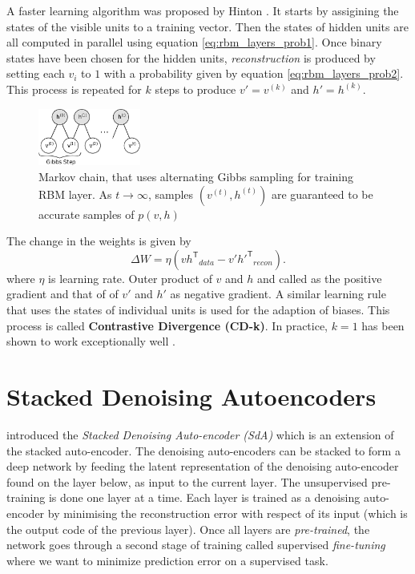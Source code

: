A faster learning algorithm was proposed by Hinton \cite{hinton2002training,hinton2006reducing,hinton2010practical}. It starts by assigining the states of the visible units to a training vector. Then the states of hidden units are all computed in parallel using equation \ref{eq:rbm_layers_prob1}. Once binary states have been chosen for the hidden units, \textit{reconstruction} is produced by setting each $v_i$ to $1$ with a probability given by equation \ref{eq:rbm_layers_prob2}. This process is repeated for $k$ steps to produce $v'= v^{(k)}$ and $h' = h^{(k)}$. 

\begin{figure}[ht]
\centering
\includegraphics[width=0.3\textwidth]{./imgs/markov_chain.png}
\caption[Markov chain of training RBM layer]{Markov chain, that uses alternating Gibbs sampling for training RBM layer. As $t \rightarrow \infty$, samples $(v^{(t)}, h^{(t)})$ are guaranteed to be accurate samples of $p(v,h)$}
\label{fig:rbmmarkovChain}
\end{figure}

The change in the weights is given by
$$ \Delta W = \eta ({vh^\mathsf{T}}_{data} - {v'h'^{\mathsf{T}}}_{recon}). $$
where $\eta$ is learning rate. Outer product of $v$ and $h$ and called as the positive gradient and that of of $v'$ and $h'$ as negative gradient. A similar learning rule that uses the states of individual units is used for the adaption of biases. This process is called \textbf{Contrastive Divergence (CD-k)}. In practice, $k=1$ has been shown to work exceptionally well \cite{hinton2010practical}.

\section{Stacked Denoising Autoencoders}
\citet{vincent2010stacked} introduced the \emph{Stacked Denoising Auto-encoder (SdA)} which is an extension of the stacked auto-encoder. The denoising auto-encoders can be stacked to form a deep network by feeding the latent representation of the denoising auto-encoder found on the layer below, as input to the current layer. The unsupervised pre-training is done one layer at a time. Each layer is trained as a denoising auto-encoder by minimising the reconstruction error with respect of its input (which is the output code of the previous layer). Once all layers are \textit{pre-trained}, the network goes through a second stage of training called supervised \textit{fine-tuning} where we want to minimize prediction error on a supervised task.

